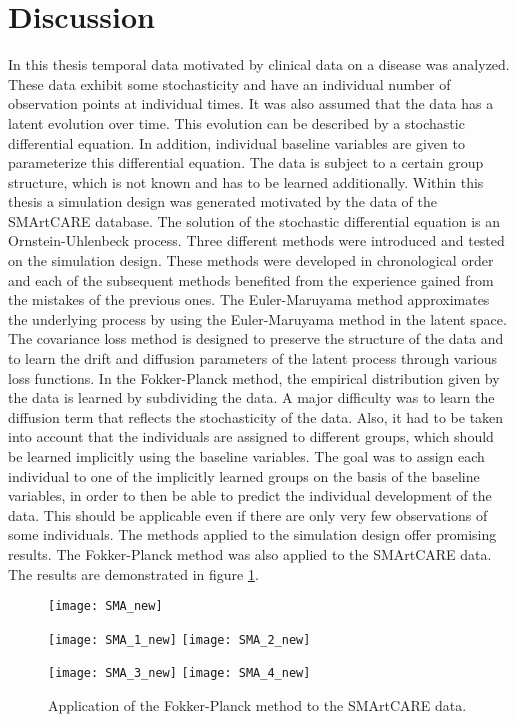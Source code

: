\documentclass[11pt,titlepage]{article}
\theoremstyle{definition}
\theoremstyle{remark}
\begin{document}
	\clearpage

	\section*{Discussion}
	
	In this thesis temporal data motivated by clinical data on a disease was analyzed. These data exhibit some stochasticity and have an individual number of observation points at individual times. It was also assumed that the data has a latent evolution over time. This evolution can be described by a stochastic differential equation. In addition, individual baseline variables are given to parameterize this differential equation. The data is subject to a certain group structure, which is not known and has to be learned additionally. Within this thesis a simulation design was generated motivated by the data of the SMArtCARE database. The solution of the stochastic differential equation is an Ornstein-Uhlenbeck process. Three different methods were introduced and tested on the simulation design. These methods were developed in chronological order and each of the subsequent methods benefited from the experience gained from the mistakes of the previous ones. The Euler-Maruyama method approximates the underlying process by using the Euler-Maruyama method in the latent space. The covariance loss method is designed to preserve the structure of the data and to learn the drift and diffusion parameters of the latent process through various loss functions. In the Fokker-Planck method, the empirical distribution given by the data is learned by subdividing the data. A major difficulty was to learn the diffusion term that reflects the stochasticity of the data. Also, it had to be taken into account that the individuals are assigned to different groups, which should be learned implicitly using the baseline variables. The goal was to assign each individual to one of the implicitly learned groups on the basis of the baseline variables, in order to then be able to predict the individual development of the data. This should be applicable even if there are only very few observations of some individuals. The methods applied to the simulation design offer promising results. The Fokker-Planck method was also applied to the SMArtCARE data. The results are demonstrated in figure \ref{Res: FP SMA}.
	
	\begin{figure}[!h]
		\begin{minipage}[m]{\textwidth}
			\texttt{[image: SMA\_new]}
		\end{minipage}
		\begin{minipage}[m]{\textwidth}
			\texttt{[image: SMA\_1\_new]}
			\texttt{[image: SMA\_2\_new]}
		\end{minipage}
		\begin{minipage}[m]{\textwidth}
			\texttt{[image: SMA\_3\_new]}
			\texttt{[image: SMA\_4\_new]}
		\end{minipage}
		\caption{Application of the Fokker-Planck method to the SMArtCARE data.}
		\label{Res: FP SMA}
	\end{figure}
	
\end{document}
